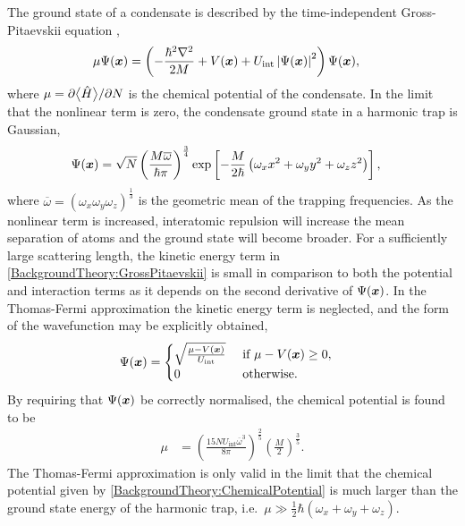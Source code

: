 The ground state of a condensate is described by the time-independent Gross-Pitaevskii equation \citep{Leggett:2001},
\begin{align}
    \mu \Psi(\bm{x}) &= \left(- \frac{\hbar^2 \nabla^2}{2M} + V(\bm{x}) + U_\text{int} \left|\Psi(\bm{x})\right|^2 \right) \Psi(\bm{x}),
\end{align}
where $\mu = \partial {\ensuremath{\big<\hat{H}\big>}} / \partial N$ is the chemical potential of the condensate.  In the limit that the nonlinear term is zero, the condensate ground state in a harmonic trap is Gaussian,
\begin{align}
    \Psi(\bm{x}) &= \sqrt{N} \left(\frac{M \overline{\omega}}{\hbar \pi} \right)^{\frac{3}{4}} \exp\left[ - \frac{M}{2 \hbar} \left(\omega_x x^2 + \omega_y y^2 + \omega_z z^2\right) \right],
\end{align}
where $\overline{\omega} = \left(\omega_x \omega_y \omega_z\right)^{\frac{1}{3}}$ is the geometric mean of the trapping frequencies.  As the nonlinear term is increased, interatomic repulsion will increase the mean separation of atoms and the ground state will become broader.  For a sufficiently large scattering length, the kinetic energy term in \eqref{BackgroundTheory:GrossPitaevskii} is small in comparison to both the potential and interaction terms as it depends on the second derivative of $\Psi(\bm{x})$.  In the Thomas-Fermi approximation the kinetic energy term is neglected, and the form of the wavefunction may be explicitly obtained,
\begin{align}
    \Psi(\bm{x}) &= 
    \begin{cases}
        \sqrt{\frac{\mu - V(\bm{x})}{U_\text{int}}} &\text{ if } \mu - V(\bm{x}) \geq 0,\\
        0 & \text{ otherwise.}
    \end{cases}
\end{align}
By requiring that $\Psi(\bm{x})$ be correctly normalised, the chemical potential is found to be
\begin{align}
    \mu &= \left(\frac{15 N U_\text{int} \overline{\omega}^3}{8 \pi} \right)^{\frac{2}{5}} \left(\frac{M}{2} \right)^{\frac{3}{5}}. \label{BackgroundTheory:ChemicalPotential}
\end{align}
The Thomas-Fermi approximation is only valid in the limit that the chemical potential given by \eqref{BackgroundTheory:ChemicalPotential} is much larger than the ground state energy of the harmonic trap, i.e.\ $\mu \gg \frac{1}{2} \hbar (\omega_x + \omega_y + \omega_z)$.

